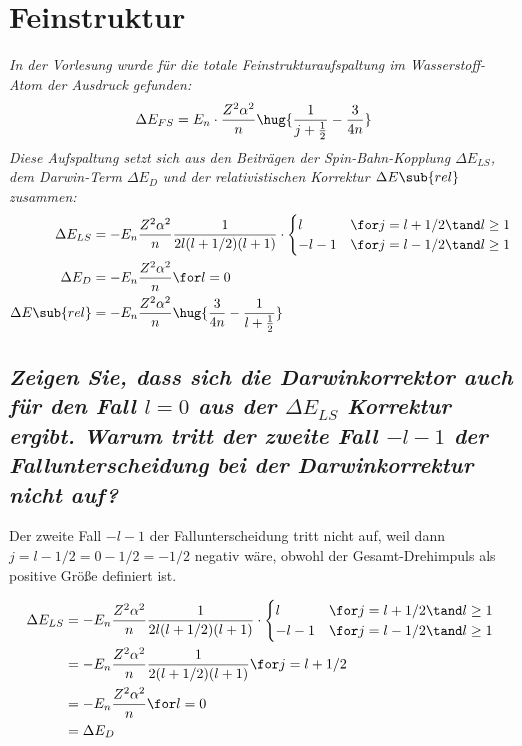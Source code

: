 \documentclass[ex, minted]{exercise_4.0}
\begin{document}
\section{Feinstruktur}
{\it In der Vorlesung wurde für die totale Feinstrukturaufspaltung im Wasserstoff-Atom der Ausdruck gefunden:
\begin{align}
    \Delta E_{FS} &= E_n \cdot \frac{Z^2\alpha^2}{n} \hug{\frac{1}{j+\frac12} - \frac{3}{4n}}
\end{align}
Diese Aufspaltung setzt sich aus den Beiträgen der Spin-Bahn-Kopplung \(\Delta E_{LS}\), dem Darwin-Term \(\Delta E_D\) und der relativistischen Korrektur \(\Delta E\sub{rel}\) zusammen: 
\begin{align*}
    \Delta E_{LS} &= - E_n \frac{Z^2\alpha^2}{n} \frac{1}{2l(l+1/2)(l+1)}\cdot \begin{cases}
        l &\for j=l+1/2 \tand l\ge1\\ 
        -l-1 &\for j=l-1/2 \tand l\ge1\\ 
    \end{cases}\\
    \Delta E_D &= - E_n \frac{Z^2\alpha^2}{n} \for l=0\\
    \Delta E\sub{rel} &= -E_n \frac{Z^2\alpha^2}{n} \hug{\frac3{4n} - \frac{1}{l+\frac12}}
\end{align*}
}

\subsection{\it Zeigen Sie, dass sich die Darwinkorrektor auch für den Fall \(l=0\) aus der \(\Delta E_{LS}\) Korrektur ergibt. Warum tritt der zweite Fall \(-l-1\) der Fallunterscheidung bei der Darwinkorrektur nicht auf?}

\dottedlinett

Der zweite Fall \(-l-1\) der Fallunterscheidung tritt nicht auf, weil dann \(j=l-1/2=0-1/2=-1/2\) negativ wäre, obwohl der Gesamt-Drehimpuls als positive Größe definiert ist.

\begin{align*}
    \Delta E_{LS} &= - E_n \frac{Z^2\alpha^2}{n} \frac{1}{2l(l+1/2)(l+1)}\cdot \begin{cases}
        l &\for j=l+1/2 \tand l\ge1\\ 
        -l-1 &\for j=l-1/2 \tand l\ge1\\ 
    \end{cases}\\
    &= - E_n \frac{Z^2\alpha^2}{n} \frac{1}{2(l+1/2)(l+1)}\for j=l+1/2\\
    &= - E_n \frac{Z^2\alpha^2}{n} \for l=0\\
    &= \Delta E_D
\end{align*}
\end{document}
